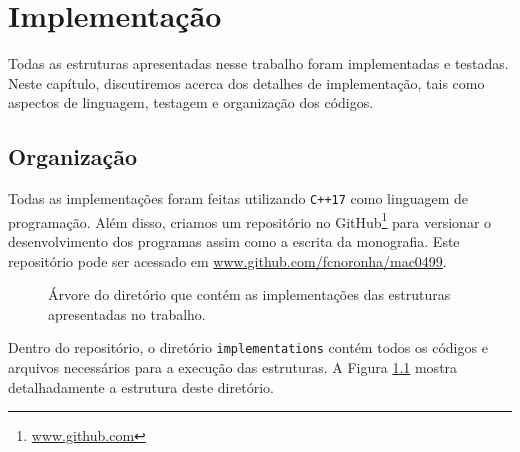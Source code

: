 
\chapter{Implementação}
\label{cap:implementacao}

Todas as estruturas apresentadas nesse trabalho foram implementadas e testadas. Neste capítulo, discutiremos acerca dos detalhes de implementação, tais como aspectos de linguagem, testagem e organização dos códigos.

\section{Organização}

Todas as implementações foram feitas utilizando \texttt{C++17} como linguagem de programação. Além disso, criamos um repositório no GitHub\footnote{\url{www.github.com}} para versionar o desenvolvimento dos programas assim como a escrita da monografia. Este repositório pode ser acessado em \url{www.github.com/fcnoronha/mac0499}.

\begin{figure}[h!]
    \centering
    \caption{Árvore do diretório que contém as implementações das estruturas apresentadas no trabalho.}
    \label{fig:rep-tree}
\end{figure}


Dentro do repositório, o diretório \texttt{implementations} contém todos os códigos e arquivos necessários para a execução das estruturas. A Figura \ref{fig:rep-tree} mostra detalhadamente a estrutura deste diretório.

